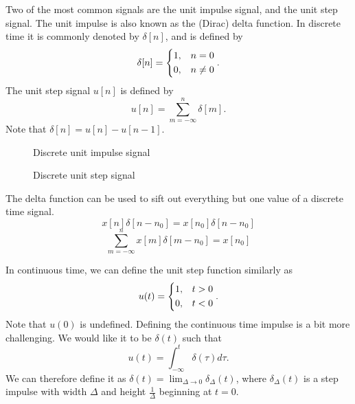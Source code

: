 Two of the most common signals are the unit impulse signal, and the unit step signal. The unit impulse is also known as the (Dirac) delta function. In discrete time it is commonly denoted by $\delta[n]$, and is defined by
\[\delta[n] =
\begin{dcases}
    1, & n = 0 \\
    0, & n \neq 0
\end{dcases}.\] The unit step signal $u[n]$ is defined by
\[u[n] = \sum_{m=-\infty}^{n}\delta[m].\] Note that $\delta[n] = u[n] - u[n-1]$.

\begin{figure}[ht!]
    \centering
\caption{Discrete unit impulse signal}
\label{fig:discrete-unit-impulse}
\end{figure}

\begin{figure}[ht!]
    \centering
\caption{Discrete unit step signal}
\label{fig:discrete-unit-step}
\end{figure}

The delta function can be used to sift out everything but one value of a discrete time signal.
\[x[n]\delta[n-n_0] = x[n_0]\delta[n-n_0]\]
\[\sum_{m=-\infty}^n x[m]\delta[m-n_0] = x[n_0]\]

In continuous time, we can define the unit step function similarly as \[u(t) =
\begin{dcases}
    1, & t > 0 \\
    0, & t < 0
\end{dcases}.\]
Note that $u(0)$ is undefined. Defining the continuous time impulse is a bit more challenging. We would like it to be $\delta(t)$ such that
\[u(t) = \int_{-\infty}^{t}\delta(\tau)d\tau.\] We can therefore define it as $\delta(t) = \lim_{\Delta\to 0}\delta_{\Delta}(t)$, where $\delta_{\Delta}(t)$ is a step impulse with width $\Delta$ and height $\frac{1}{\Delta}$ beginning at $t = 0$.

